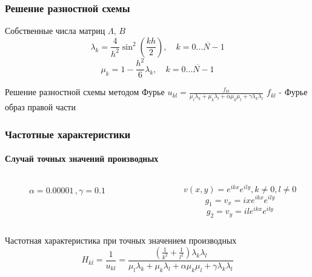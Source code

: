 \documentclass[11pt]{beamer}
\begin{document}
\begin{frame}
\frametitle{Решение разностной схемы}
\begin{block}{Собственные числа матриц $\Lambda,\,B$}
$$
\lambda_k = \frac{4}{h^2} \sin^2(\frac{kh}{2}),\quad k = \overline{0 \ldots N-1}
$$
$$
\mu_k = 1 - \frac{h^2}{6}\lambda_k,\quad k = \overline{0 \ldots N-1}
$$

\end{block}


\begin{block}{Решение разностной схемы методом Фурье}
$u_{kl} = \frac{f_{kl}}{\mu_l \lambda_k + \mu_k \lambda_l + \alpha \mu_k \mu_l + \gamma \lambda_k \lambda_l}$
$f_{kl}$ - Фурье образ правой части
\end{block}
\end{frame}

\begin{frame}
\frametitle{Частотные характеристики}
\framesubtitle{Случай точных значений производных}
\begin{columns}
\begin{column}{0.5\linewidth}
\begin{figure}[H]
\caption{$\alpha = 0.00001\,,\gamma = 0.1$}
\end{figure}
\end{column}
\begin{column}{0.5\textwidth}
$$v(x,y) = e^{ikx}e^{ily}, k \neq 0, l \neq 0$$
$$g_1 = v_x =ixe^{ikx}e^{ily}$$
$$ g_2 = v_y = ile^{ikx}e^{ily}$$
\end{column}

\end{columns}
\begin{block}{Частотная характеристика при точных значением производных}
$$
H_{kl} = \frac{1}{u_{kl}} = \frac{(\frac{1}{k^2} + \frac{1}{l^2})\lambda_k\lambda_l}{\mu_l \lambda_k + \mu_k \lambda_l + \alpha \mu_k \mu_l + \gamma \lambda_k \lambda_l}
$$
\end{block}
\end{frame}
\end{document}
